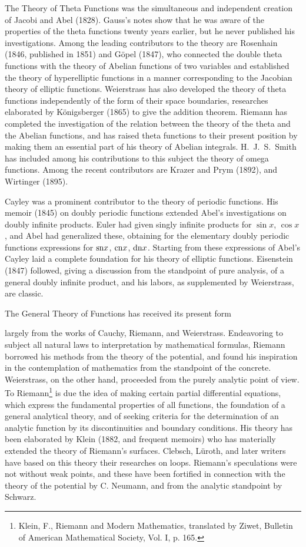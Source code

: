 \documentclass[oneside]{book}
\begin{document}
{The Theory of Theta Functions was the simultaneous and independent
creation of Jacobi and Abel (1828). Gauss's notes show that he was
aware of the properties of the theta functions twenty years earlier,
but he never published his investigations. Among the leading
contributors to the theory are Rosenhain (1846, published in 1851)
and G\"opel (1847), who connected the double theta functions with
the theory of Abelian functions of two variables and established the
theory of hyperelliptic functions in a manner corresponding to the
Jacobian theory of elliptic functions. Weierstrass has also
developed the theory of theta functions independently of the form of
their space boundaries, researches elaborated by K\"onigsberger
(1865) to give the addition theorem. Riemann has completed the
investigation of the relation between the theory of the theta and
the Abelian functions, and has raised theta functions to their
present position by making them an essential part of his theory of
Abelian integrals. H.~J.~S.~Smith has included among his
contributions to this subject the theory of omega functions. Among
the recent contributors are Krazer and Prym (1892), and Wirtinger
(1895).

Cayley was a prominent contributor to the theory of periodic
functions. His memoir (1845) on doubly periodic functions extended
Abel's investigations on doubly infinite products. Euler had given
singly infinite products for $\sin x$, $\cos x$, and Abel had
generalized these, obtaining for the elementary doubly periodic
functions expressions for $\hbox{sn} x$, $\hbox{cn} x$, $\hbox{dn}
x$. Starting from these expressions of Abel's Cayley laid a complete
foundation for his theory of elliptic functions. Eisenstein (1847)
followed, giving a discussion from the standpoint of pure analysis,
of a general doubly infinite product, and his labors, as
supplemented by Weierstrass, are classic.

The General Theory of Functions has received its present form

largely from the works of Cauchy, Riemann, and
Weierstrass. Endeavoring to subject all natural laws to
interpretation by mathematical formulas, Riemann borrowed his
methods from the theory of the potential, and found his inspiration
in the contemplation of mathematics from the standpoint of the
concrete. Weierstrass, on the other hand, proceeded from the purely
analytic point of view. To Riemann\footnote{Klein, F., Riemann and
Modern Mathematics, translated by Ziwet, Bulletin of American
Mathematical Society, Vol. I, p. 165.} is due the idea of making
certain partial differential equations, which express the
fundamental properties of all functions, the foundation of a general
analytical theory, and of seeking criteria for the determination of
an analytic function by its discontinuities and boundary
conditions. His theory has been elaborated by Klein (1882, and
frequent memoirs) who has materially extended the theory of
Riemann's surfaces. Clebsch, L\"uroth, and later writers have based on
this theory their researches on loops. Riemann's speculations were
not without weak points, and these have been fortified in connection
with the theory of the potential by C. Neumann, and from the
analytic standpoint by Schwarz.

}
\end{document}
